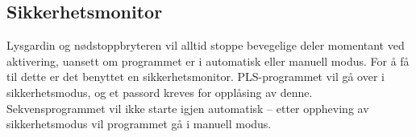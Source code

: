 \documentclass[Visionprosjekt.tex]{subfiles}
\begin{document}
\subsection{Sikkerhetsmonitor}
\label{sub:sikk}

Lysgardin og nødstoppbryteren vil alltid stoppe bevegelige deler momentant ved aktivering, uansett om programmet er i automatisk eller manuell modus. For å få til dette er det benyttet en sikkerhetsmonitor. 
PLS-programmet vil gå over  i sikkerhetsmodus, og et passord kreves for opplåsing av denne. Sekvensprogrammet vil ikke starte igjen automatisk -- etter oppheving av sikkerhetsmodus vil programmet gå i manuell modus.
\end{document}

